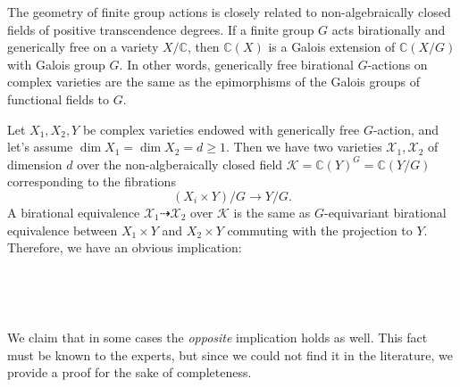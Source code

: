 \documentclass[12pt,a4paper]{amsart}
\theoremstyle{definition}
\theoremstyle{remark}
\newcommand{\C}{\mathbb{C}}
\begin{document}
The geometry of finite group actions is closely related to non-algebraically closed fields of positive transcendence degrees. If a finite group $G$ acts birationally and generically free on a variety $X/\C$, then $\C(X)$ is a Galois extension of $\C(X/G)$ with Galois group $G$. In other words, generically free birational $G$-actions on complex varieties are the same as the epimorphisms of the Galois groups of functional fields to $G$.

Let $X_1,X_2,Y$ be complex varieties endowed with generically free $G$-action, and let's assume $\dim X_1=\dim X_2=d\ge 1$. 
Then we have two varieties $\mathcal X_1, \mathcal X_2$ of dimension $d$ over the non-algberaically closed field $\mathcal K=\C(Y)^G=\C(Y/G)$ corresponding to the fibrations 
$$(X_i\times Y)/G\to Y/G.$$
A birational equivalence $\mathcal X_1\dashrightarrow\mathcal X_2$ over $\mathcal K$ is the same as $G$-equivariant birational equivalence between $X_1\times Y$ and $X_2 \times Y$ commuting with the projection to $Y$. Therefore, we have an obvious implication:

\ 

\begin{center}
\noindent{}
\end{center}

\ 

We claim that in some cases the \textit{opposite} implication holds as well. This fact must be known to the experts, but since we could not find it in the literature, we provide a
proof for the sake of completeness.
\end{document}
